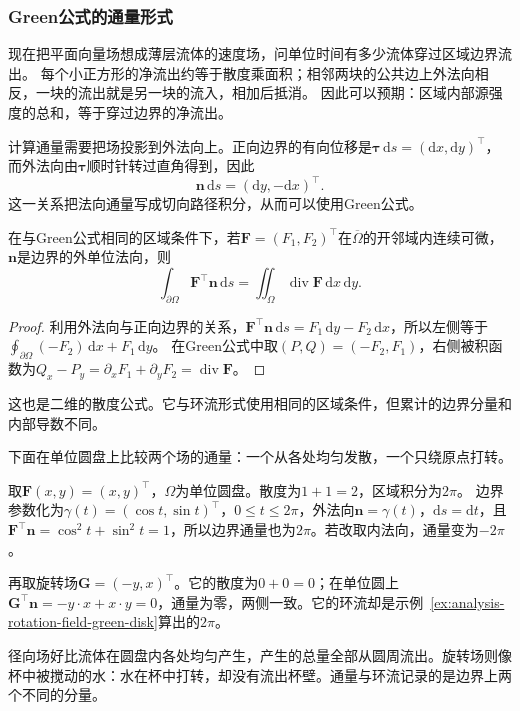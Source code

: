 \subsubsection{Green公式的通量形式}

现在把平面向量场想成薄层流体的速度场，问单位时间有多少流体穿过区域边界流出。
每个小正方形的净流出约等于散度乘面积；相邻两块的公共边上外法向相反，一块的流出就是另一块的流入，相加后抵消。
因此可以预期：区域内部源强度的总和，等于穿过边界的净流出。

计算通量需要把场投影到外法向上。正向边界的有向位移是$\bm\tau\,\mathrm ds=(\mathrm dx,\mathrm dy)^\top$，而外法向由$\bm\tau$顺时针转过直角得到，因此
\[
 \bm n\,\mathrm ds=(\mathrm dy,-\mathrm dx)^\top.
\]
这一关系把法向通量写成切向路径积分，从而可以使用Green公式。
\begin{theorem}[平面区域的通量公式]
\label{thm:multivariable-planar-flux}
在与Green公式相同的区域条件下，若$\bm F=(F_1,F_2)^\top$在$\overline\Omega$的开邻域内连续可微，
$\bm n$是边界的外单位法向，则
\[
 \int_{\partial\Omega}\bm F^\top\bm n\,\mathrm ds
 =\iint_\Omega\operatorname{div}\bm F\,\mathrm dx\,\mathrm dy.
\]
\end{theorem}
\begin{proof}
利用外法向与正向边界的关系，$\bm F^\top\bm n\,\mathrm ds=F_1\,\mathrm dy-F_2\,\mathrm dx$，所以左侧等于
$\oint_{\partial\Omega}(-F_2)\,\mathrm dx+F_1\,\mathrm dy$。
在Green公式中取$(P,Q)=(-F_2,F_1)$，右侧被积函数为$Q_x-P_y=\partial_xF_1+\partial_yF_2=\operatorname{div}\bm F$。
\end{proof}
这也是二维的散度公式。它与环流形式使用相同的区域条件，但累计的边界分量和内部导数不同。

下面在单位圆盘上比较两个场的通量：一个从各处均匀发散，一个只绕原点打转。
\begin{example}[单位圆盘上径向场与旋转场的通量]
取$\bm F(x,y)=(x,y)^\top$，$\Omega$为单位圆盘。散度为$1+1=2$，区域积分为$2\pi$。
边界参数化为$\gamma(t)=(\cos t,\sin t)^\top$，$0\leq t\leq2\pi$，外法向$\bm n=\gamma(t)$，$\mathrm ds=\mathrm dt$，且$\bm F^\top\bm n=\cos^2t+\sin^2t=1$，所以边界通量也为$2\pi$。若改取内法向，通量变为$-2\pi$。

再取旋转场$\bm G=(-y,x)^\top$。它的散度为$0+0=0$；在单位圆上$\bm G^\top\bm n=-y\cdot x+x\cdot y=0$，通量为零，两侧一致。它的环流却是示例~\ref{ex:analysis-rotation-field-green-disk}算出的$2\pi$。
\end{example}
径向场好比流体在圆盘内各处均匀产生，产生的总量全部从圆周流出。旋转场则像杯中被搅动的水：水在杯中打转，却没有流出杯壁。通量与环流记录的是边界上两个不同的分量。

